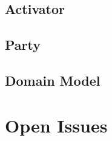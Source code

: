 \documentclass[11pt]{article}
\begin{document}
	\subsection{Activator}
		
		\newpage
		
	\subsection{Party}
		
		\newpage
		
	\subsection{Domain Model}
		
		\newpage
		
	\section{Open Issues}
		
	
\end{document}
